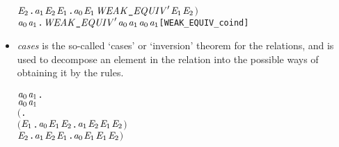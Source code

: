 \begin{itemize}
\begin{alltt}
            \HOLSymConst{\HOLTokenForall{}}\ensuremath{\HOLBoundVar{E}\sb{\mathrm{2}}}. \ensuremath{\HOLBoundVar{a}\sb{\mathrm{1}}} \HOLTokenTransBegin\HOLSymConst{\ensuremath{\tau}}\HOLTokenTransEnd \ensuremath{\HOLBoundVar{E}\sb{\mathrm{2}}} \HOLSymConst{\HOLTokenImp{}} \HOLSymConst{\HOLTokenExists{}}\ensuremath{\HOLBoundVar{E}\sb{\mathrm{1}}}. \ensuremath{\HOLBoundVar{a}\sb{\mathrm{0}}} \HOLSymConst{\HOLTokenEPS} \ensuremath{\HOLBoundVar{E}\sb{\mathrm{1}}} \HOLSymConst{\HOLTokenConj{}} \ensuremath{\HOLBoundVar{WEAK\HOLTokenUnderscore{}EQUIV}\sp{\prime}} \ensuremath{\HOLBoundVar{E}\sb{\mathrm{1}}} \ensuremath{\HOLBoundVar{E}\sb{\mathrm{2}}}\ensuremath{)} \HOLSymConst{\HOLTokenImp{}}
       \HOLSymConst{\HOLTokenForall{}}\ensuremath{\HOLBoundVar{a}\sb{\mathrm{0}}} \ensuremath{\HOLBoundVar{a}\sb{\mathrm{1}}}. \ensuremath{\HOLBoundVar{WEAK\HOLTokenUnderscore{}EQUIV}\sp{\prime}} \ensuremath{\HOLBoundVar{a}\sb{\mathrm{0}}} \ensuremath{\HOLBoundVar{a}\sb{\mathrm{1}}} \HOLSymConst{\HOLTokenImp{}} \ensuremath{\HOLBoundVar{a}\sb{\mathrm{0}}} \HOLSymConst{\HOLTokenWeakEQ} \ensuremath{\HOLBoundVar{a}\sb{\mathrm{1}}}\hfill{[WEAK_EQUIV_coind]}
\end{alltt}
\item \emph{cases} is the so-called `cases' or `inversion' theorem for
  the relations, and is used to decompose an element in the relation into the possible ways of
  obtaining it by the rules.
\begin{alltt}
\HOLTokenTurnstile{} \HOLSymConst{\HOLTokenForall{}}\ensuremath{\HOLBoundVar{a}\sb{\mathrm{0}}} \ensuremath{\HOLBoundVar{a}\sb{\mathrm{1}}}.
       \ensuremath{\HOLBoundVar{a}\sb{\mathrm{0}}} \HOLSymConst{\HOLTokenWeakEQ} \ensuremath{\HOLBoundVar{a}\sb{\mathrm{1}}} \HOLSymConst{\HOLTokenEquiv{}}
       \ensuremath{(}\HOLSymConst{\HOLTokenForall{}}.
            \ensuremath{(}\HOLSymConst{\HOLTokenForall{}}\ensuremath{\HOLBoundVar{E}\sb{\mathrm{1}}}. \ensuremath{\HOLBoundVar{a}\sb{\mathrm{0}}} \HOLTokenTransBegin{} \HOLTokenTransEnd \ensuremath{\HOLBoundVar{E}\sb{\mathrm{1}}} \HOLSymConst{\HOLTokenImp{}} \HOLSymConst{\HOLTokenExists{}}\ensuremath{\HOLBoundVar{E}\sb{\mathrm{2}}}. \ensuremath{\HOLBoundVar{a}\sb{\mathrm{1}}} \HOLTokenWeakTransBegin{} \HOLTokenWeakTransEnd \ensuremath{\HOLBoundVar{E}\sb{\mathrm{2}}} \HOLSymConst{\HOLTokenConj{}} \ensuremath{\HOLBoundVar{E}\sb{\mathrm{1}}} \HOLSymConst{\HOLTokenWeakEQ} \ensuremath{\HOLBoundVar{E}\sb{\mathrm{2}}}\ensuremath{)} \HOLSymConst{\HOLTokenConj{}}
            \HOLSymConst{\HOLTokenForall{}}\ensuremath{\HOLBoundVar{E}\sb{\mathrm{2}}}. \ensuremath{\HOLBoundVar{a}\sb{\mathrm{1}}} \HOLTokenTransBegin{} \HOLTokenTransEnd \ensuremath{\HOLBoundVar{E}\sb{\mathrm{2}}} \HOLSymConst{\HOLTokenImp{}} \HOLSymConst{\HOLTokenExists{}}\ensuremath{\HOLBoundVar{E}\sb{\mathrm{1}}}. \ensuremath{\HOLBoundVar{a}\sb{\mathrm{0}}} \HOLTokenWeakTransBegin{} \HOLTokenWeakTransEnd \ensuremath{\HOLBoundVar{E}\sb{\mathrm{1}}} \HOLSymConst{\HOLTokenConj{}} \ensuremath{\HOLBoundVar{E}\sb{\mathrm{1}}} \HOLSymConst{\HOLTokenWeakEQ} \ensuremath{\HOLBoundVar{E}\sb{\mathrm{2}}}\ensuremath{)} \HOLSymConst{\HOLTokenConj{}}

\end{alltt}
\end{itemize}
